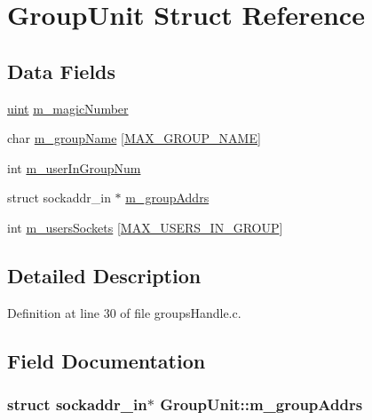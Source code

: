 \hypertarget{structGroupUnit}{}\section{Group\+Unit Struct Reference}
\label{structGroupUnit}
\subsection*{Data Fields}
\begin{DoxyCompactItemize}
\item 
\hyperlink{tcp_8h_a91ad9478d81a7aaf2593e8d9c3d06a14}{uint} \hyperlink{structGroupUnit_adebe1ebe6cef4759963d9e6307696797}{m\+\_\+magic\+Number}
\item 
char \hyperlink{structGroupUnit_a409e7e31fd67aea55e1d8611002022bb}{m\+\_\+group\+Name} \mbox{[}\hyperlink{Protocol_8h_adc4e6fd253319f9ad9e2d019d4ac021d}{M\+A\+X\+\_\+\+G\+R\+O\+U\+P\+\_\+\+N\+A\+ME}\mbox{]}
\item 
int \hyperlink{structGroupUnit_aa54d969aa019270c753db0aa6f5ad01b}{m\+\_\+user\+In\+Group\+Num}
\item 
struct sockaddr\+\_\+in $\ast$ \hyperlink{structGroupUnit_a14e35c5f590a048c33b931f8a464ee04}{m\+\_\+group\+Addrs}
\item 
int \hyperlink{structGroupUnit_a4c0b8c3b8b06c8fc45883f5ab017b55c}{m\+\_\+users\+Sockets} \mbox{[}\hyperlink{groupsHandle_8c_a4369ed57d4c3779df5b0f11389ecee66}{M\+A\+X\+\_\+\+U\+S\+E\+R\+S\+\_\+\+I\+N\+\_\+\+G\+R\+O\+UP}\mbox{]}
\end{DoxyCompactItemize}


\subsection{Detailed Description}


Definition at line 30 of file groups\+Handle.\+c.



\subsection{Field Documentation}
\subsubsection[{\texorpdfstring{m\+\_\+group\+Addrs}{m_groupAddrs}}]{\setlength{\rightskip}{0pt plus 5cm}struct sockaddr\+\_\+in$\ast$ Group\+Unit\+::m\+\_\+group\+Addrs}\hypertarget{structGroupUnit_a14e35c5f590a048c33b931f8a464ee04}{}\label{structGroupUnit_a14e35c5f590a048c33b931f8a464ee04}


